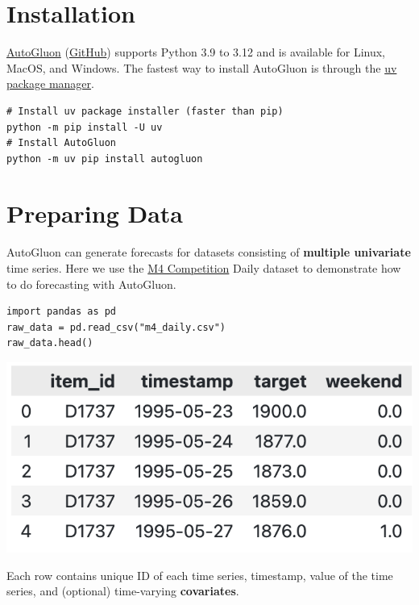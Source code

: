 \section*{Installation}
\href{https://auto.gluon.ai/stable/index.html}{AutoGluon} (\href{https://github.com/autogluon/autogluon/}{GitHub}) supports Python 3.9 to 3.12 and is available for Linux, MacOS, and Windows. The fastest way to install AutoGluon is through the \href{https://docs.astral.sh/uv/}{uv package manager}.

\begin{verbatim}
# Install uv package installer (faster than pip)
python -m pip install -U uv
# Install AutoGluon
python -m uv pip install autogluon
\end{verbatim}


\section*{Preparing Data}

AutoGluon can generate forecasts for datasets consisting of \textbf{multiple univariate} time series. Here we use the \href{https://www.sciencedirect.com/science/article/pii/S0169207019301128}{M4 Competition} Daily dataset to demonstrate how to do forecasting with AutoGluon.

\begin{verbatim}
import pandas as pd
raw_data = pd.read_csv("m4_daily.csv")
raw_data.head()
\end{verbatim}

\begin{center}
\includegraphics[width=0.6\linewidth]{timeseries/images/raw_data.png}
\end{center}

\medskip

Each row contains unique ID of each time series, timestamp, value of the time series, and (optional) time-varying \textbf{covariates}.

